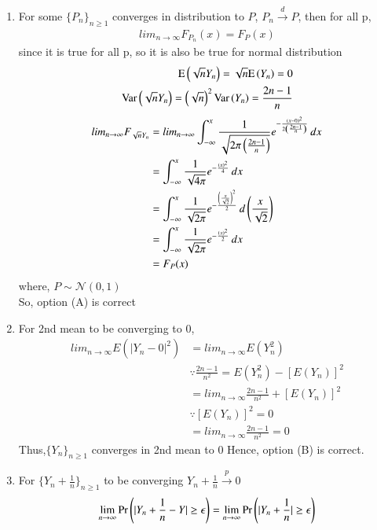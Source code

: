 \documentclass[journal,12pt,Twocolumn]{IEEEtran}
\theoremstyle{remark}
\begin{document}
\begin{enumerate}[label=(\Alph*)]
\item 
For some $\{P_n\}_{n \geq 1}$  converges in distribution to $P$, $P_n \xrightarrow{d} P$, then for all p,
\begin{align}
lim_{n \to \infty} F_{P_n}(x) = F_{P}(x) 
\end{align}
since it is true for all p, so it is also be true for normal distribution
\begin{align}
\text{E}\left(\sqrt{n}Y_n\right)=\sqrt{n}\text{E}\left(Y_n\right)=0 \\
\text{Var}\left(\sqrt{n}Y_n\right)=\left(\sqrt{n}\right)^2\text{Var}\left(Y_n\right) = \frac{2n-1}{n}
\end{align}
\begin{align}
lim_{n \to \infty} F_{\sqrt{n}Y_n} 
&= lim_{n \to \infty} \int_{-\infty}^{x} \frac{1}{\sqrt{2\pi\left(\frac{2n-1}{n}\right)}}e^{-\frac{\left(x-0\right)^2}{2\left(\frac{2n-1}{n}\right)}} \,dx \\
&=\int_{-\infty}^{x} \frac{1}{\sqrt{4\pi}}e^{-\frac{\left(x\right)^2}{4}} \,dx \\
&=\int_{-\infty}^{x} \frac{1}{\sqrt{2\pi}}e^{-\frac{\left(\frac{x}{\sqrt{2}}\right)^2}{2}} \,d\left(\frac{x}{\sqrt{2}}\right) \\
&=\int_{-\infty}^{x} \frac{1}{\sqrt{2\pi}}e^{-\frac{\left(x\right)^2}{2}} \,dx \\
&=F_P(x)
\end{align}
where, $P \sim \mathcal{N}(0,1)$ \\
So, option (A) is correct\
\item For 2nd mean to be converging to 0,
\begin{align}
lim_{n \to \infty} E(|Y_n-0|^2)&=lim_{n \to \infty} E(Y_n^2) \\
&\because \frac{2n-1}{n^2} = E(Y_n^2) - [E(Y_n)]^2 \\
&=lim_{n \to \infty} \frac{2n-1}{n^2} + [E(Y_n)]^2 \\
&\because [E(Y_n)]^2 = 0 \\
&=lim_{n \to \infty} \frac{2n-1}{n^2} = 0 
\end{align}
Thus,$\{Y_n\}_{n \geq 1}$ converges in 2nd mean to 0
Hence, option (B) is correct.
\item For $\{Y_n+\frac{1}{n}\}_{n \geq 1}$ to be converging $Y_n +\frac{1}{n} \xrightarrow{p} 0$ \\
\begin{align}
\lim_{n \to \infty} \pr{|Y_n +\frac{1}{n}-Y| \geq  \epsilon} 
&=\lim_{n \to \infty} \pr{|Y_n +\frac{1}{n}| \geq  \epsilon} \\ 

\end{align}
\end{enumerate}
\end{document}

